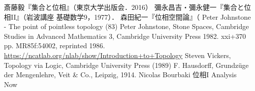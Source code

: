 \documentclass[uplatex,dvipdfmx]{jsreport}
\begin{document}
\begin{thebibliography}{99}
    斎藤毅『集合と位相』（東京大学出版会．2016）
    彌永昌吉・彌永健一『集合と位相II』（岩波講座 基礎数学9，1977）．
    森田紀一『位相空間論』（
        Peter Johnstone - The point of pointless topology (83)
        Peter Johnstone, Stone Spaces, Cambridge Studies in Advanced Mathematics 3, Cambridge University Press 1982. xxi+370 pp. MR85f:54002, reprinted 1986.
        \url{https://ncatlab.org/nlab/show/Introduction+to+Topology}
        Steven Vickers, Topology via Logic, Cambridge University Press (1989)
    F. Hausdorff, Grundzüge der Mengenlehre, Veit \& Co., Leipzig, 1914.
    Nicolas Bourbaki 位相I
    Analysis Now
\end{thebibliography}
\end{document}
